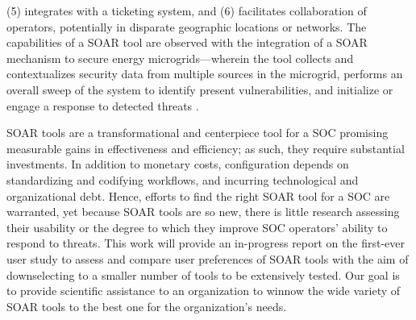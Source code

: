 (5) integrates with a ticketing system, and 
(6) facilitates collaboration of operators, potentially in disparate geographic locations or networks. 
The capabilities of a SOAR tool are observed with the integration of a SOAR mechanism to secure energy microgrids---wherein the tool collects and contextualizes security data from multiple sources in the microgrid, performs an overall sweep of the system to identify present vulnerabilities, and initialize or engage a response to detected threats \citep{microgrid}.

SOAR tools are a transformational and centerpiece tool for a SOC promising measurable gains in effectiveness and efficiency; 
as such, they require substantial investments. 
In addition to monetary costs, configuration depends on standardizing and codifying workflows, and incurring technological and organizational debt. 
Hence, efforts to find the right SOAR tool for a SOC are warranted, yet because SOAR tools are so new, there is little research assessing their usability or the degree to which they improve SOC operators' ability to respond to threats. 
This work will provide an in-progress report on the first-ever user study to assess and compare user preferences of SOAR tools with the aim of downselecting to a smaller number of tools to be extensively tested. %
Our goal is to provide scientific assistance to an organization to winnow the wide variety of SOAR tools to the best one for the organization's needs. 

